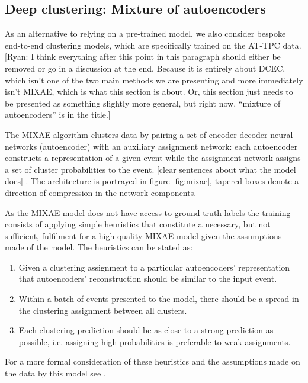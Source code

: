 \documentclass[review,number,sort&compress]{elsarticle}
\begin{document}
\subsection{Deep clustering: Mixture of autoencoders}\label{sec:mixae}

As an alternative to relying on a pre-trained model, we also consider bespoke end-to-end clustering models, which are specifically trained on the AT-TPC data. {\color{cyan} [Ryan: I think everything after this point in this paragraph should either be removed or go in a discussion at the end. Because it is entirely about DCEC, which isn't one of the two main methods we are presenting and more immediately isn't MIXAE, which is what this section is about. Or, this section just needs to be presented as something slightly more general, but right now, ``mixture of autoencoders'' is in the title.]} 

The MIXAE algorithm clusters data by pairing a set of encoder-decoder neural networks (autoencoder) with an auxiliary assignment network: each autoencoder constructs a representation of a given event while the assignment network assigns a set of cluster probabilities to the event. {\color{orange}[clear sentences about what the model does]} . The architecture is portrayed in figure \ref{fig:mixae}, tapered boxes denote a direction of compression in the network components. 

As the MIXAE model does not have access to ground truth labels the training consists of applying simple heuristics that constitute a necessary, but not sufficient, fulfilment for a high-quality MIXAE model given the assumptions made of the model. The heuristics can be stated as: 
\begin{enumerate}
	\item  Given a clustering assignment to a particular autoencoders' representation that autoencoders' reconstruction should be similar to the input event. 
	\item Within a batch of events presented to the model, there should be a spread in the clustering assignment between all clusters. 
	\item Each clustering prediction should be as close to a strong prediction as possible, i.e. assigning high probabilities is preferable to weak assignments.
\end{enumerate}

\noindent For a more formal consideration of these heuristics and the assumptions made on the data by this model see \citet{Zhang}.
\end{document}
